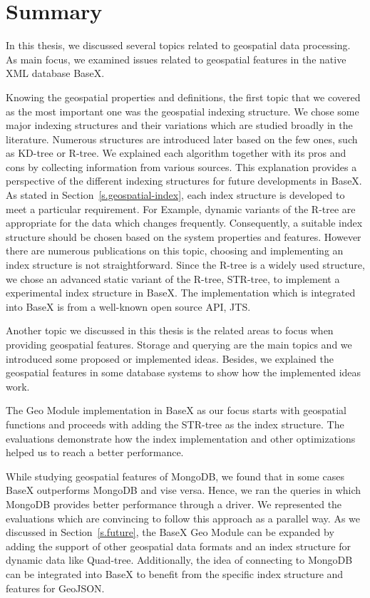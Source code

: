 \documentclass[a4paper,12pt]{article}
\begin{document}
\newpage
\section{Summary}
\label{sum}
In this thesis, we discussed several topics related to geospatial data processing. As main focus, we examined issues related to geospatial features in the native XML database BaseX. 

Knowing the geospatial properties and definitions, the first topic that we covered as the most important one was the geospatial indexing structure. We chose some major indexing structures and their variations which are studied broadly in the literature. Numerous structures are introduced later based on the few ones, such as KD-tree or R-tree. We explained each algorithm together with its pros and cons by collecting information from various sources. This explanation provides a perspective of the different indexing structures for future developments in BaseX. As stated in Section~\ref{s.geospatial-index}, each index structure is developed to meet a particular requirement. For Example, dynamic variants of the R-tree are appropriate for the data which changes frequently. Consequently, a suitable index structure should be chosen based on the system properties and features. However there are numerous publications on this topic, choosing and implementing an index structure is not straightforward. Since the R-tree is a widely used structure, we chose an advanced static variant of the R-tree, STR-tree, to implement a experimental index structure in BaseX. The implementation which is integrated into BaseX is from a well-known open source API, JTS. 

Another topic we discussed in this thesis is the related areas to focus when providing geospatial features.
Storage and querying are the main topics and we introduced some proposed or implemented ideas. Besides, we explained the geospatial features in some database systems to show how the implemented ideas work.


The Geo Module implementation in BaseX as our focus starts with geospatial functions and proceeds with adding the STR-tree as the index structure. The evaluations demonstrate how the index implementation and other optimizations helped us to reach a better performance.


While studying geospatial features of MongoDB, we found that in some cases BaseX outperforms MongoDB and vise versa. Hence, we ran the queries in which MongoDB provides better performance through a driver. We represented the evaluations which are convincing to follow this approach as a parallel way. 
As we discussed in Section~\ref{s.future}, the BaseX Geo Module can be expanded by adding the support of other geospatial data formats and an index structure for dynamic data like Quad-tree. Additionally, the idea of connecting to MongoDB can be integrated into BaseX to benefit from the specific index structure and features for GeoJSON.



\newpage


\newpage
\listoffigures
\newpage
\listoftables
\newpage
\lstlistoflistings
\end{document}
